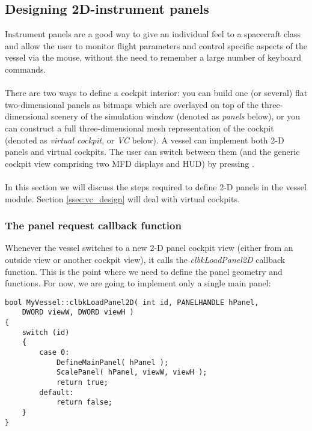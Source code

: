 \documentclass[Orbiter Developer Manual.tex]{subfiles}
\begin{document}
\subsection{Designing 2D-instrument panels}
\label{ssec:2d_panel_design}
Instrument panels are a good way to give an individual feel to a spacecraft class and allow the user to monitor flight parameters and control specific aspects of the vessel via the mouse, without the need to remember a large number of keyboard commands.\\
\\
There are two ways to define a cockpit interior: you can build one (or several) flat two-dimensional panels as bitmaps which are overlayed on top of the three-dimensional scenery of the simulation window (denoted as \textit{panels} below), or you can construct a full three-dimensional mesh representation of the cockpit (denoted as \textit{virtual cockpit}, or \textit{VC} below). A vessel can implement both 2-D panels and virtual cockpits. The user can switch between them (and the generic cockpit view comprising two MFD displays and HUD) by pressing .\\
\\
In this section we will discuss the steps required to define 2-D panels in the vessel module. Section \ref{ssec:vc_design} will deal with virtual cockpits.

\subsubsection{The panel request callback function}
Whenever the vessel switches to a new 2-D panel cockpit view (either from an outside view or another cockpit view), it calls the \textit{clbkLoadPanel2D} callback function. This is the point where we need to define the panel geometry and functions. For now, we are going to implement only a single main panel:

\begin{lstlisting}
bool MyVessel::clbkLoadPanel2D( int id, PANELHANDLE hPanel,
	DWORD viewW, DWORD viewH )
{
	switch (id)
	{
		case 0: 
			DefineMainPanel( hPanel );
			ScalePanel( hPanel, viewW, viewH );
			return true;
		default:
			return false;
	}
}
\end{lstlisting}
\end{document}
